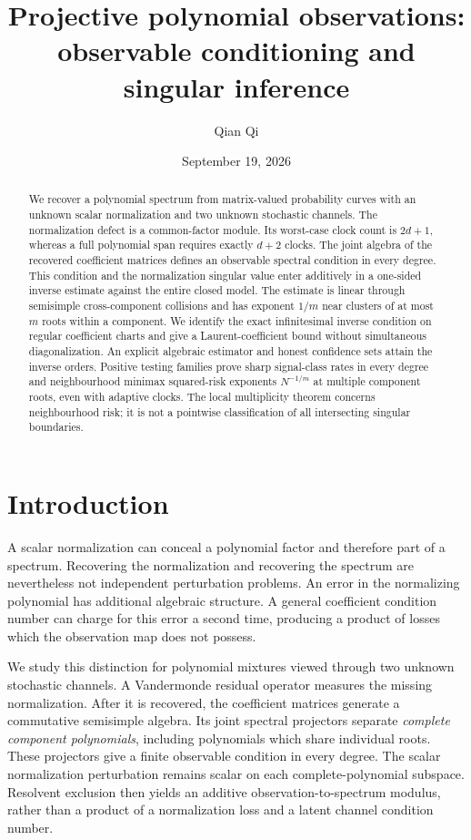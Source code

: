 \documentclass[11pt,reqno]{amsart}
\title[Projective polynomial observations]{Projective polynomial observations:\\ observable conditioning and singular inference}
\author{Qian Qi}
\date{September 19, 2026}
\numberwithin{equation}{section}
\theoremstyle{definition}\newtheorem{definition}[theorem]{Definition}
\theoremstyle{remark}\newtheorem{remark}[theorem]{Remark}
\begin{document}
\begin{abstract}
We recover a polynomial spectrum from matrix-valued probability curves
with an unknown scalar normalization and two unknown stochastic channels.
The normalization defect is a common-factor module. Its worst-case
clock count is $2d+1$, whereas a full polynomial span requires exactly
$d+2$ clocks. The joint algebra of the recovered coefficient matrices
defines an observable spectral condition in every degree. This condition
and the normalization singular value enter additively in a one-sided
inverse estimate against the entire closed model. The estimate is linear
through semisimple cross-component collisions and has exponent $1/m$
near clusters of at most $m$ roots within a component. We identify the
exact infinitesimal inverse condition on regular coefficient charts and
give a Laurent-coefficient bound without simultaneous diagonalization.
An explicit algebraic estimator and honest confidence sets attain the
inverse orders. Positive testing families prove sharp signal-class
rates in every degree and neighbourhood minimax squared-risk exponents
$N^{-1/m}$ at multiple component roots, even with adaptive clocks.
The local multiplicity theorem concerns neighbourhood risk; it is not
a pointwise classification of all intersecting singular boundaries.
\end{abstract}
\maketitle

\section{Introduction}
A scalar normalization can conceal a polynomial factor and therefore
part of a spectrum. Recovering the normalization and recovering the
spectrum are nevertheless not independent perturbation problems. An
error in the normalizing polynomial has additional algebraic structure.
A general coefficient condition number can charge for this error a
second time, producing a product of losses which the observation map
does not possess.

We study this distinction for polynomial mixtures viewed through two
unknown stochastic channels. A Vandermonde residual operator measures
the missing normalization. After it is recovered, the coefficient
matrices generate a commutative semisimple algebra. Its joint spectral
projectors separate \emph{complete component polynomials}, including
polynomials which share individual roots. These projectors give a
finite observable condition in every degree. The scalar normalization
perturbation remains scalar on each complete-polynomial subspace.
Resolvent exclusion then yields an additive observation-to-spectrum
modulus, rather than a product of a normalization loss and a latent
channel condition number.
\end{document}
